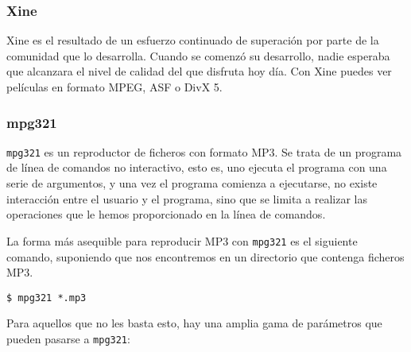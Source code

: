 
\subsubsection*{Xine}

{\sf Xine} es el resultado de un esfuerzo continuado de superación por
parte  de  la  comunidad  que  lo desarrolla.  Cuando  se  comenzó  su
desarrollo, nadie esperaba  que alcanzara el nivel de  calidad del que
disfruta hoy día. Con {\sf Xine} puedes ver películas en formato MPEG,
ASF o DivX 5.



\subsubsection*{mpg321} 

{\tt mpg321} es  un reproductor de ficheros con formato  MP3. Se trata
de  un programa  de línea  de comandos  no interactivo,  esto es,  uno
ejecuta el programa con una serie de argumentos, y una vez el programa
comienza a  ejecutarse, no  existe interacción entre  el usuario  y el
programa, sino que  se limita a realizar las operaciones  que le hemos
proporcionado en la línea de comandos.

La forma  más asequible  para reproducir  MP3 con  {\tt mpg321}  es el
siguiente  comando, suponiendo  que nos  encontremos en  un directorio
que contenga ficheros MP3.

\begin{verbatim}
$ mpg321 *.mp3
\end{verbatim}

Para aquellos que no les basta esto, hay una amplia gama de parámetros
que pueden pasarse a {\tt mpg321}:

